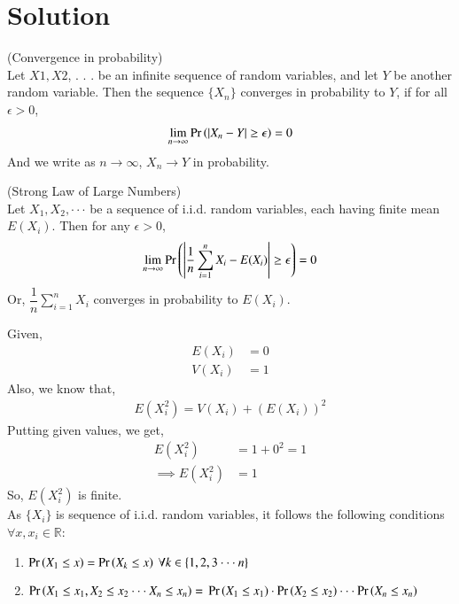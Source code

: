 \documentclass[journal,12pt,twocolumn]{IEEEtran}
\begin{document}
\section{Solution}
\begin{definition}
    (Convergence in probability)\\
    Let $X1, X2$, . . . be an infinite sequence of random variables, and let $Y$ be another random variable. Then the sequence $\{X_n\}$ converges in probability to $Y$, if for all $\epsilon >0$, 
    \begin{align}
        \lim_{n \to \infty}\Pr\left(|X_n-Y|\geq \epsilon\right)=0
    \end{align}
And we write as $n \to \infty$, $X_n \to Y$ in probability.
\end{definition}
\begin{theorem}
    (Strong Law of Large Numbers)\\
    Let $X_1, X_2, \cdot \cdot \cdot$ be a sequence of i.i.d. random variables, each having finite mean $E(X_i)$. Then for any $\epsilon >0$,
    \begin{align}
        \lim_{n \to \infty}\Pr\left(\left|\dfrac{1}{n}\sum_{i=1}^nX_i - E(X_i)\right|\geq \epsilon\right)=0
    \end{align}
    Or, $\dfrac{1}{n}\sum_{i=1}^nX_i$ converges in probability to $E(X_i)$.
\end{theorem}
Given,
\begin{align} 
    E(X_i)&=0 
    \label{a}\\
    V(X_i)&=1
    \label{b}
\end{align}
Also, we know that,
\begin{align}
    E(X_i^2)=V(X_i)+(E(X_i))^2
\end{align}
Putting given values, we get,
\begin{align} \label{c}
    E(X_i^2)&=1+0^2=1 \\
    \implies E(X_i^2)&=1
\end{align}
So, $E(X_i^2)$ is finite.\\
As $\{X_i\}$ is sequence of i.i.d. random variables, it follows the following conditions $\forall x,x_i \in \mathbb{R}$:
\begin{enumerate}
    \item $\pr{X_1 \leq x}=\pr{X_k \leq x} \ \forall k \in \{1,2,3 \cdot \cdot     \cdot n\}$
    \item $\Pr\left(X_1 \leq x_1, X_2 \leq x_2 \cdot \cdot \cdot X_n \leq x_n \right) =\\
        \Pr\left(X_1 \leq x_1\right) \cdot \Pr\left(X_2 \leq x_2\right) \cdot \cdot \cdot \Pr\left(X_n \leq x_n\right)$
\end{enumerate}
\end{document}
